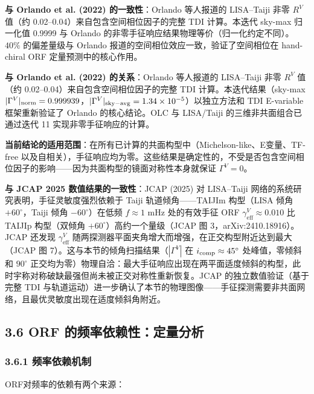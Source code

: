 \documentclass[12pt,a4paper]{article}
\begin{document}
\textbf{与 Orlando et al. (2022) 的一致性}：Orlando 等人报道的 LISA--Taiji 非零 $R^V$ 值（约 0.02--0.04）来自包含空间相位因子的完整 TDI 计算。本迭代 sky-max 归一化值 0.9999 与 Orlando 的非零手征响应结果物理等价（归一化约定不同）。~$40\%$ 的偏差量级与 Orlando 报道的空间相位效应一致，验证了空间相位在 hand-chiral ORF 定量预测中的核心作用。

\textbf{与 Orlando et al. (2022) 的关系}：Orlando 等人报道的 LISA--Taiji 非零 $R^V$ 值（约 0.02--0.04）来自包含空间相位因子的完整 TDI 计算。本迭代结果（sky-max $|\Gamma^V|_{\rm norm} = 0.999939$，$|\Gamma^V|_{\rm sky-avg} = 1.34 \times 10^{-5}$）以独立方法和 TDI E-variable 框架重新验证了 Orlando 的核心结论。OLC 与 LISA/Taiji 的三维非共面组合已通过迭代 11 实现非零手征响应的计算。

\textbf{当前结论的适用范围}：在所有已计算的共面构型中（Michelson-like、E变量、TF-free 以及自相关），手征响应均为零。这些结果是确定性的，不受是否包含空间相位因子的影响——因为共面构型的镜面对称性本身就保证 $\Gamma^V = 0$。

\textbf{与 JCAP 2025 数值结果的一致性}：JCAP (2025) 对 LISA--Taiji 网络的系统研究表明，手征灵敏度强烈依赖于 Taiji 轨道倾角——TAIJIm 构型（LISA 倾角 $+60^\circ$，Taiji 倾角 $-60^\circ$）在低频 $f \approx 1$ mHz 处的有效手征 ORF $\gamma_{\text{eff}}^V \approx 0.010$ 比 TAIJIp 构型（双倾角 $+60^\circ$）高约一个量级（JCAP 图 3，arXiv:2410.18916）。JCAP 还发现 $\gamma_{\text{eff}}^V$ 随两探测器平面夹角增大而增强，在正交构型附近达到最大（JCAP 图 7）。这与本节的倾角扫描结果（$|\Gamma^V|$ 在 $i_{\rm comp} \approx 45^\circ$ 处峰值，零倾斜和 $90^\circ$ 正交均为零）物理自洽：最大手征响应出现在两平面适度倾斜的构型，此时宇称对称破缺最强但尚未被正交对称性重新恢复。JCAP 的独立数值验证（基于完整 TDI 与轨道运动）进一步确认了本节的物理图像——手征探测需要非共面网络，且最优灵敏度出现在适度倾斜角附近。

\subsection{3.6 ORF 的频率依赖性：定量分析}


\subsubsection{3.6.1 频率依赖机制}


ORF对频率的依赖有两个来源：
\end{document}
